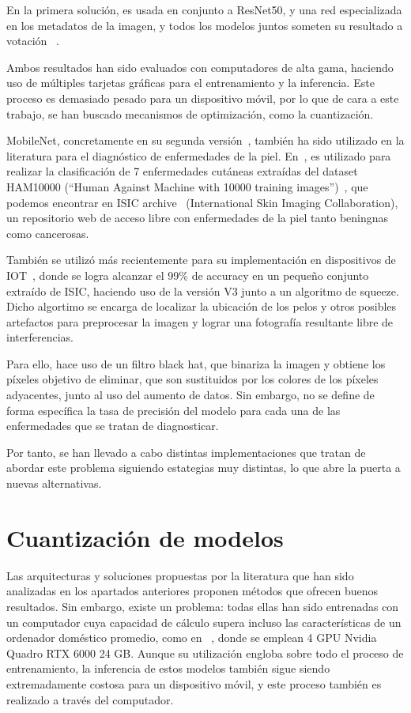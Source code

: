  En la primera solución, es usada en conjunto a ResNet50, y una red especializada en los metadatos de la imagen, y todos los modelos juntos someten su resultado a votación ~\cite{1stISIC}.

Ambos resultados han sido evaluados con computadores de alta gama, haciendo uso de múltiples tarjetas gráficas para el entrenamiento y la inferencia. Este proceso es demasiado pesado para un dispositivo móvil, por lo que de cara a este trabajo, se han buscado mecanismos de optimización, como la cuantización.

MobileNet, concretamente en su segunda versión~\cite{sandler2019mobilenetv2}, también ha sido utilizado en la literatura para el diagnóstico de enfermedades de la piel. En~\cite{Chaturvedi_2020}, es utilizado para realizar la clasificación de 7 enfermedades cutáneas extraídas del dataset HAM10000 (``Human Against Machine with 10000 training images'')~\cite{ham10000}, que podemos encontrar en ISIC archive~\cite{isicarchive} (International Skin Imaging Collaboration), un repositorio web de acceso libre con enfermedades de la piel tanto beningnas como cancerosas. 

También se utilizó más recientemente para su implementación en dispositivos de IOT~\cite{mnetsqueeze}, donde se logra alcanzar el 99\% de accuracy en un pequeño conjunto extraído de ISIC, haciendo uso de la versión V3 junto a un algoritmo de squeeze. Dicho algortimo se encarga de localizar la ubicación de los pelos y otros posibles artefactos para preprocesar la imagen y lograr una fotografía resultante libre de interferencias. 

Para ello, hace uso de un filtro black hat, que binariza la imagen y obtiene los píxeles objetivo de eliminar, que son sustituidos por los colores de los píxeles adyacentes, junto al uso del aumento de datos. Sin embargo, no se define de forma específica la tasa de precisión del modelo para cada una de las enfermedades que se tratan de diagnosticar.

Por tanto, se han llevado a cabo distintas implementaciones que tratan de abordar este problema siguiendo estategias muy distintas, lo que abre la puerta a nuevas alternativas.

 \section{Cuantización de modelos}
\label{cap:cuantización}
Las arquitecturas y soluciones propuestas por la literatura que han sido analizadas en los apartados anteriores proponen métodos que ofrecen buenos resultados. Sin embargo, existe un problema: todas ellas han sido entrenadas con un computador cuya capacidad de cálculo supera incluso las características de un ordenador doméstico promedio, como en ~\cite{2ndISIC}, donde se emplean 4  GPU Nvidia Quadro RTX 6000 24 GB. Aunque su utilización engloba sobre todo el proceso de entrenamiento, la inferencia de estos modelos también sigue siendo extremadamente costosa para un dispositivo móvil, y este proceso también es realizado a través del computador.

